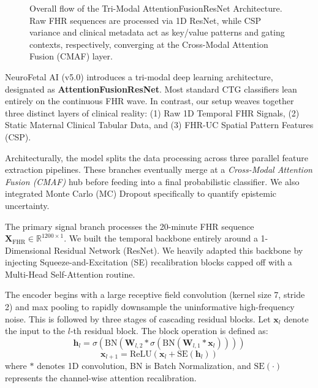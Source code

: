 \documentclass[conference]{IEEEtran}
\begin{document}
\begin{figure}[htbp]
{
}
\vspace{0.3cm}
\caption{Overall flow of the Tri-Modal AttentionFusionResNet Architecture. Raw FHR sequences are processed via 1D ResNet, while CSP variance and clinical metadata act as key/value patterns and gating contexts, respectively, converging at the Cross-Modal Attention Fusion (CMAF) layer.}
\label{fig:arch}
\end{figure}



NeuroFetal AI (v5.0) introduces a tri-modal deep learning architecture, designated as \textbf{AttentionFusionResNet}. Most standard CTG classifiers lean entirely on the continuous FHR wave. In contrast, our setup weaves together three distinct layers of clinical reality: 
(1) Raw 1D Temporal FHR Signals, 
(2) Static Maternal Clinical Tabular Data, and 
(3) FHR-UC Spatial Pattern Features (CSP). 

Architecturally, the model splits the data processing across three parallel feature extraction pipelines. These branches eventually merge at a \textit{Cross-Modal Attention Fusion (CMAF)} hub before feeding into a final probabilistic classifier. We also integrated Monte Carlo (MC) Dropout specifically to quantify epistemic uncertainty.

The primary signal branch processes the 20-minute FHR sequence $\mathbf{X}_{\text{FHR}} \in \mathbb{R}^{1200 \times 1}$. We built the temporal backbone entirely around a 1-Dimensional Residual Network (ResNet). We heavily adapted this backbone by injecting Squeeze-and-Excitation (SE) recalibration blocks \cite{hu2018} capped off with a Multi-Head Self-Attention routine. 

The encoder begins with a large receptive field convolution (kernel size 7, stride 2) and max pooling to rapidly downsample the uninformative high-frequency noise. This is followed by three stages of cascading residual blocks. Let $\mathbf{x}_l$ denote the input to the $l$-th residual block. The block operation is defined as:
\begin{equation}
    \mathbf{h}_l = \sigma(\text{BN}(\mathbf{W}_{l,2} * \sigma(\text{BN}(\mathbf{W}_{l,1} * \mathbf{x}_l))))
\end{equation}
\begin{equation}
    \mathbf{x}_{l+1} = \text{ReLU}(\mathbf{x}_l + \text{SE}(\mathbf{h}_l))
\end{equation}
where $*$ denotes 1D convolution, BN is Batch Normalization, and $\text{SE}(\cdot)$ represents the channel-wise attention recalibration. 
\end{document}
